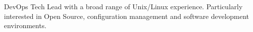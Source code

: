 

\begin{cvparagraph}

DevOps Tech Lead with a broad range of Unix/Linux experience. Particularly interested in Open Source, configuration management and software development environments.
\end{cvparagraph}
